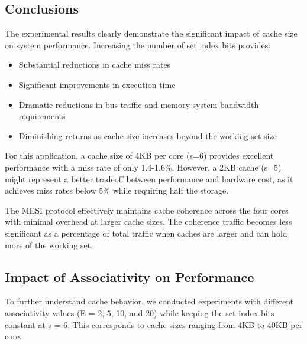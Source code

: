 \documentclass[12pt,a4paper]{article}
\begin{document}
\subsection{Conclusions}

The experimental results clearly demonstrate the significant impact of cache size on system performance. Increasing the number of set index bits provides:

\begin{itemize}
    \item Substantial reductions in cache miss rates
    \item Significant improvements in execution time
    \item Dramatic reductions in bus traffic and memory system bandwidth requirements
    \item Diminishing returns as cache size increases beyond the working set size
\end{itemize}

For this application, a cache size of 4KB per core (s=6) provides excellent performance with a miss rate of only 1.4-1.6\%. However, a 2KB cache (s=5) might represent a better tradeoff between performance and hardware cost, as it achieves miss rates below 5\% while requiring half the storage.

The MESI protocol effectively maintains cache coherence across the four cores with minimal overhead at larger cache sizes. The coherence traffic becomes less significant as a percentage of total traffic when caches are larger and can hold more of the working set.

\subsection{Impact of Associativity on Performance}

To further understand cache behavior, we conducted experiments with different associativity values (E = 2, 5, 10, and 20) while keeping the set index bits constant at s = 6. This corresponds to cache sizes ranging from 4KB to 40KB per core.
\end{document}
